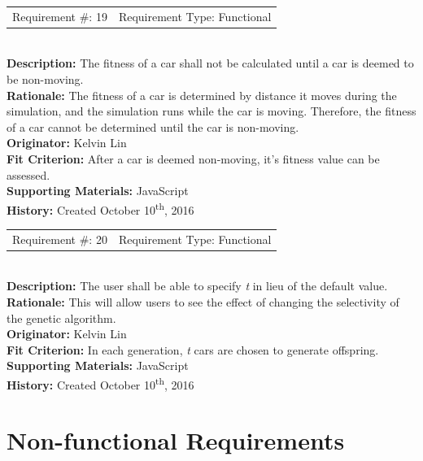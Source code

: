 \documentclass[12pt, titlepage]{article}
\begin{document}
\begin{reqbox}
	\begin{tabular}{cc}
		Requirement \#: 19 & Requirement Type: Functional \\
	\end{tabular} \\
	\textbf{Description:} The fitness of a car shall not be calculated until a car 
	is deemed to be non-moving. \\
	\textbf{Rationale:} The fitness of a car is determined by distance it moves 
	during the simulation, and the simulation runs while the car is moving. 
	Therefore, the fitness of a car cannot be determined until the car is 
	non-moving. \\
	\textbf{Originator:} Kelvin Lin\\
	\textbf{Fit Criterion:} After a car is deemed non-moving, it's fitness value 
can 
	be assessed.\\
	\textbf{Supporting Materials:} JavaScript \\
	\textbf{History:} Created October 10\textsuperscript{th}, 2016
\end{reqbox}


\begin{reqbox}
	\begin{tabular}{cc}
		Requirement \#: 20 & Requirement Type: Functional \\
	\end{tabular} \\
	\textbf{Description:} The user shall be able to specify \textit{t} in lieu of 
	the default value. \\
	\textbf{Rationale:} This will allow users to see the effect of changing the 
	selectivity of the genetic algorithm. \\
	\textbf{Originator:} Kelvin Lin\\
	\textbf{Fit Criterion:} In each generation, \textit{t} cars are chosen to 
	generate offspring. \\
	\textbf{Supporting Materials:} JavaScript \\
	\textbf{History:} Created October 10\textsuperscript{th}, 2016
\end{reqbox}

\newpage


\section{Non-functional Requirements}
\end{document}
